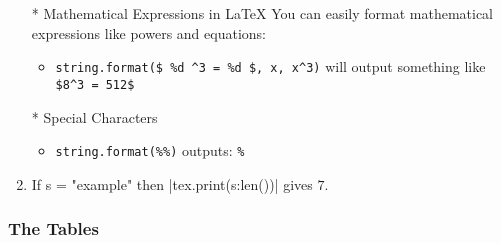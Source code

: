 \begin{enumerate}[label=(\alph*)]
* Mathematical Expressions in LaTeX
You can easily format mathematical expressions like powers and equations:
\begin{itemize}
  \item \texttt{string.format(\$ \%d \textasciicircum 3 = \%d \$, x, x\textasciicircum3)} will output something like \texttt{\$8\textasciicircum 3 = 512\$}
\end{itemize}

* Special Characters
\begin{itemize}
  \item \texttt{string.format(\%\%)} outputs: \texttt{\%}
\end{itemize}


\item If s = "example" then |tex.print(s:len())| gives $7$.
\end{enumerate}

\subsubsection{The Tables}

